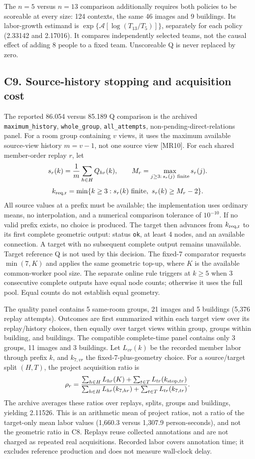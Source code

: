 The $n=5$ versus $n=13$ comparison additionally requires both policies to
be scoreable at every size: 124 contexts, the same 46 images and 9 buildings.
Its labor-growth estimand is
$\exp\{\mathcal A[\log(T_{13}/T_5)]\}$, separately for each policy
(2.33142 and 2.17016). It compares independently selected teams,
not the causal effect of adding 8 people to a fixed team.
Unscoreable Q is never replaced by zero.

\subsection*{C9. Source-history stopping and acquisition cost}
The reported 86.054 versus 85.189 Q comparison is the archived
\texttt{maximum\_history}, \texttt{whole\_group},
\texttt{all\_attempts}, non-pending-direct-relations panel.
For a room group containing $v$ views, it uses the maximum available
source-view history $m=v-1$, not one source view [MR10].
For each shared member-order replay $r$, let
\[
 s_r(k)=\frac{1}{m}\sum_{h\in H} Q_{hr}(k),\qquad
 M_r=\max_{j\geq3:\,s_r(j)\ {\rm finite}}s_r(j).
\]
\[
 k_{\rm req,r}=
 \min\{k\geq3:s_r(k)\ {\rm finite},\ s_r(k)\geq M_r-2\}.
\]
All source values at a prefix must be available; the implementation uses
ordinary means, no interpolation, and a numerical comparison tolerance
of $10^{-10}$. If no valid prefix exists, no choice is produced.
The target then advances from $k_{\rm req,r}$ to its first complete
geometric output: status \texttt{ok}, at least 4 nodes, and an available
connection. A target with no subsequent complete output remains unavailable.
Target reference Q is not used by this decision. The fixed-7 comparator
requests $\min(7,K)$ and applies the same geometric top-up, where $K$ is
the available common-worker pool size.
The separate online rule triggers at $k\geq5$ when 3 consecutive
complete outputs have equal node counts; otherwise it uses the full pool.
Equal counts do not establish equal geometry.

The quality panel contains 5 same-room groups, 21 images and 5
buildings (5,376 replay attempts). Outcomes are first summarized
within each target view over its replay/history choices, then equally
over target views within group, groups within building, and buildings.
The compatible complete-time panel contains only 3 groups,
11 images and 3 buildings. Let $L_{vr}(k)$ be the recorded member
labor through prefix $k$, and $k_{7,vr}$ the fixed-7-plus-geometry choice.
For a source/target split $(H,T)$, the project acquisition ratio is
\[
 \rho_r=
 \frac{\sum_{h\in H}L_{hr}(K)+
       \sum_{t\in T}L_{tr}(k_{{\rm stop},tr})}
      {\sum_{h\in H}L_{hr}(k_{7,hr})+
       \sum_{t\in T}L_{tr}(k_{7,tr})}.
\]
The archive averages these ratios over replays, splits, groups and buildings,
yielding 2.11526. This is an arithmetic mean of project ratios,
not a ratio of the target-only mean labor values
(1,660.3 versus 1,307.9 person-seconds), and not the geometric ratio in C8.
Replays reuse collected annotations and are not charged as repeated
real acquisitions. Recorded labor covers annotation time; it excludes reference production and does not measure wall-clock delay.

